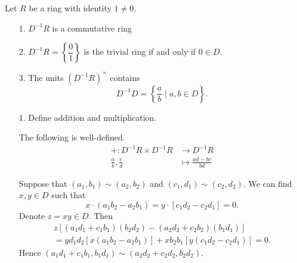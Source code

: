     \begin{proposition}
        Let $R$ be a ring with identity $1 \ne 0$. 

        \begin{itemize} 
            \item[1.] $D^{-1}R$ is a commutative ring 
            \item[2.] $D^{-1}R = \left\{\dfrac{0}{1}\right\}$ is
            the trivial ring if and only if $0 \in D$.
            \item[3.] The units $(D^{-1}R)^\times$ contains 
            \[
                D^{-1}D = \left\{ \frac{a}{b} \mid a, b \in D \right\}.
            \] 
        \end{itemize}
    \end{proposition}

    \begin{prf}
        \begin{itemize}
            \item[1.]
            Define addition and multiplication. 
            \begin{lemma}
                The following is well-defined. 
                \begin{align*}
                    +: D^{-1}R \times D^{-1}R &\longrightarrow D^{-1}R\\
                    \frac{a}{b}, \frac{c}{d} &\longmapsto \frac{ad - bc}{bd}
                \end{align*}
            \end{lemma}
            Suppose that $(a_1, b_1) \sim (a_2, b_2)$ and $(c_1, d_1)
            \sim (c_2, d_2)$. We can find $x, y \in D$ such that 
            \[
                x \cdot (a_1b_2 - a_2b_1) = y \cdot[c_1d_2 - c_2d_1] = 0.
            \]
            Denote $z = xy \in D$. Then 
            \begin{align*}
                z[(a_1d_1 + c_1b_1)(b_2d_2) - (a_2d_2 + c_2b_2)(b_1d_1)]
                \\=
                yd_1d_2[x(a_1b_2 - a_2b_1)]
                + xb_2b_1[y(c_1d_2 - c_2d_1)] = 0.
            \end{align*}
            Hence $(a_1d_1 + c_1b_1, b_1d_1) \sim (a_2d_2 + c_2d_2,
            b_2d_2)$. 


\end{itemize}
\end{prf}
